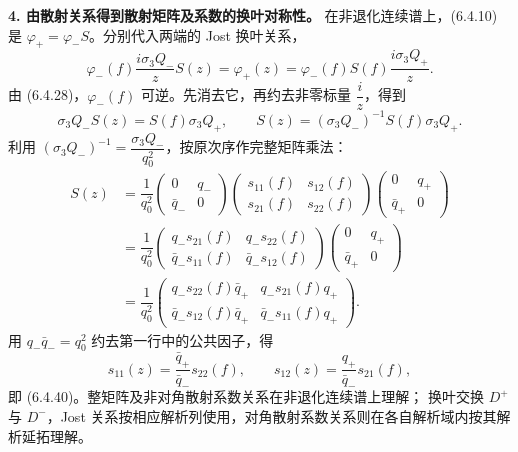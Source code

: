 \documentclass[lang=cn,scheme=chinese,mode=simple,device=normal,color=blue,
math=cm,thmcnt=section,12pt]{elegantbook}
\begin{document}
\begin{callout}[证明：(6.4.37)、(6.4.38)、(6.4.40) 的换叶对称]
    \textbf{4. 由散射关系得到散射矩阵及系数的换叶对称性。}
    在非退化连续谱上，(6.4.10) 是 $\varphi_+=\varphi_-S$。分别代入两端的 Jost 换叶关系，
    \[
        \varphi_-(f)\dfrac{i\sigma_3Q_-}{z}S(z)
        =\varphi_+(z)=\varphi_-(f)S(f)\dfrac{i\sigma_3Q_+}{z}.
    \]
    由 (6.4.28)，$\varphi_-(f)$ 可逆。先消去它，再约去非零标量 $\dfrac{i}{z}$，得到
    \[
        \sigma_3Q_-S(z)=S(f)\sigma_3Q_+,\qquad
        S(z)=(\sigma_3Q_-)^{-1}S(f)\sigma_3Q_+.
    \]
    利用 $(\sigma_3Q_-)^{-1}=\dfrac{\sigma_3Q_-}{q_0^2}$，按原次序作完整矩阵乘法：
    \[
        \begin{aligned}
            S(z) & =\dfrac{1}{q_0^2}\begin{pmatrix}0&q_-\\\bar q_-&0\end{pmatrix}
            \begin{pmatrix}s_{11}(f)&s_{12}(f)\\s_{21}(f)&s_{22}(f)\end{pmatrix}
            \begin{pmatrix}0&q_+\\\bar q_+&0\end{pmatrix}                                           \\
                 & =\dfrac{1}{q_0^2}\begin{pmatrix}q_-s_{21}(f)      & q_-s_{22}(f)      \\
               \bar q_-s_{11}(f) & \bar q_-s_{12}(f)\end{pmatrix}
            \begin{pmatrix}0&q_+\\\bar q_+&0\end{pmatrix}                                           \\
                 & =\dfrac{1}{q_0^2}\begin{pmatrix}q_-s_{22}(f)\bar q_+      & q_-s_{21}(f)q_+      \\
               \bar q_-s_{12}(f)\bar q_+ & \bar q_-s_{11}(f)q_+\end{pmatrix}.
        \end{aligned}
    \]
    用 $q_-\bar q_-=q_0^2$ 约去第一行中的公共因子，得
    \[
        s_{11}(z)=\dfrac{\bar q_+}{\bar q_-}s_{22}(f),\qquad
        s_{12}(z)=\dfrac{q_+}{\bar q_-}s_{21}(f),
    \]
    即 (6.4.40)。整矩阵及非对角散射系数关系在非退化连续谱上理解；
    换叶交换 $D^+$ 与 $D^-$，Jost 关系按相应解析列使用，对角散射系数关系则在各自解析域内按其解析延拓理解。
\end{callout}
\end{document}
